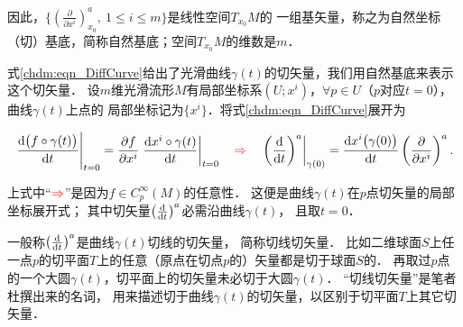 因此，$\{(\frac{\partial }{\partial x^i})^a_{x_0}, \ 1\leqslant i\leqslant m\}$是线性空间$T_{x_0}M$的
一组基矢量，称之为{\heiti 自然坐标（切）基底}，简称自然基底；空间$T_{x_0}M$的维数是$m$．


\begin{example}\label{chdm:exm_DiffCurve}
    式\eqref{chdm:eqn_DiffCurve}给出了光滑曲线$\gamma(t)$的切矢量，我们用自然基底来表示这个切矢量．
    设$m$维光滑流形$M$有局部坐标系$(U;x^i)$，$\forall p\in U$（$p$对应$t=0$），曲线$\gamma(t)$上点的
    局部坐标记为$\{x^i\}$．将式\eqref{chdm:eqn_DiffCurve}展开为
    \begin{small}
    \begin{equation}\label{chdm:eqn_DiffCurve-2}
        \left. \frac{{\rm d} \bigl(f \circ \gamma (t)\bigr)}{{\rm d} t} \right |_{t=0}
        = \frac{\partial f}{\partial x^i}
        \left. \frac{{\rm d} x^i\circ\gamma (t)}{{\rm d} t} \right |_{t=0}
        \quad {\color{red}\Rightarrow} \quad
        \left. \left(\frac{{\rm d}  }{{\rm d} t}\right)^a \right |_{\gamma (0)}
        = \frac{{\rm d} x^i\bigl(\gamma (0)\bigr)}{{\rm d} t}
        \left(\frac{\partial }{\partial x^i}\right)^a .
    \end{equation}
    \end{small}    
    上式中“${\color{red}\Rightarrow}$”是因为$f \in C^\infty_p(M)$的任意性．
    这便是曲线$\gamma(t)$在$p$点切矢量的局部坐标展开式；
    其中切矢量$\left(\frac{{\rm d}  }{{\rm d} t}\right)^a $必需沿曲线$\gamma(t)$，
    且取$t=0$．   
\end{example}

 

\begin{remark}
一般称$\left(\frac{{\rm d}  }{{\rm d} t}\right)^a $是曲线$\gamma(t)$切线的切矢量，
简称{\heiti 切线切矢量}． 
比如二维球面$S$上任一点$p$的切平面$T$上的任意（原点在切点$p$的）矢量都是切于球面$S$的．
再取过$p$点的一个大圆$\gamma(t)$，切平面上的切矢量未必切于大圆$\gamma(t)$．
“切线切矢量”是笔者杜撰出来的名词，
用来描述切于曲线$\gamma(t)$的切矢量，以区别于切平面$T$上其它切矢量．
\end{remark}



